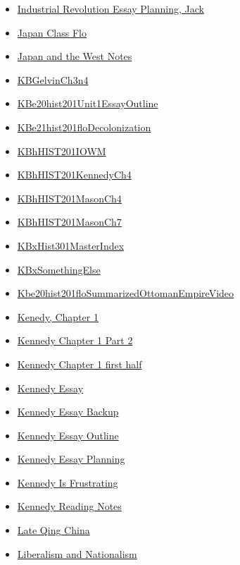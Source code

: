 \documentclass[11pt]{article}
\begin{document}
\begin{itemize}
\begin{itemize}
\item \href{hist201/KBhHIST201Unit3EssayJack.org}{Industrial Revolution Essay Planning, Jack}
\item \href{hist201/KBhHIST201JapanClassFlo.org}{Japan Class Flo}
\item \href{hist201/KBxJapanandtheWest.org}{Japan and the West Notes}
\item \href{hist201/KBGelvinCh3n4.org}{KBGelvinCh3n4}
\item \href{hist201/KBe20hist201Unit1EssayOutline.org}{KBe20hist201Unit1EssayOutline}
\item \href{hist201/KBe21hist201floDecolonization.org}{KBe21hist201floDecolonization}
\item \href{hist201/KBhHIST201IOWM.org}{KBhHIST201IOWM}
\item \href{hist201/KBhHIST201KennedyCh4.org}{KBhHIST201KennedyCh4}
\item \href{hist201/KBhHIST201MasonCh4.org}{KBhHIST201MasonCh4}
\item \href{hist201/KBhHIST201MasonCh7.org}{KBhHIST201MasonCh7}
\item \href{hist201/KBxHist301MasterIndex.org}{KBxHist301MasterIndex}
\item \href{hist201/KBxSomethingElse.org}{KBxSomethingElse}
\item \href{hist201/Kbe20hist201floSummarizedOttomanEmpireVideo.org}{Kbe20hist201floSummarizedOttomanEmpireVideo}
\item \href{hist201/KBhHIST201KennedyCh1.org}{Kenedy, Chapter 1}
\item \href{hist201/retExr0nKennedyCh1Pt2.org}{Kennedy Chapter 1 Part 2}
\item \href{hist201/KBe20hist201floKennedyCH1pt1.org}{Kennedy Chapter 1 first half}
\item \href{hist201/KBhHIST201KennedyEssay.org}{Kennedy Essay}
\item \href{hist201/KBhHIST201EssayBackup.org}{Kennedy Essay Backup}
\item \href{hist201/KBdHistMAKennedyOutline.org}{Kennedy Essay Outline}
\item \href{hist201/KBe20hist201retKennedyEssay.org}{Kennedy Essay Planning}
\item \href{hist201/KBhHIST201KennedyIsFrustrating.org}{Kennedy Is Frustrating}
\item \href{hist201/KBKennedyNotes.org}{Kennedy Reading Notes}
\item \href{hist201/KBhHIST101LateQingChina.org}{Late Qing China}
\item \href{hist201/KBhHIST201LiberalismAndNationalism.org}{Liberalism and Nationalism}

\end{itemize}
\end{itemize}
\end{document}
